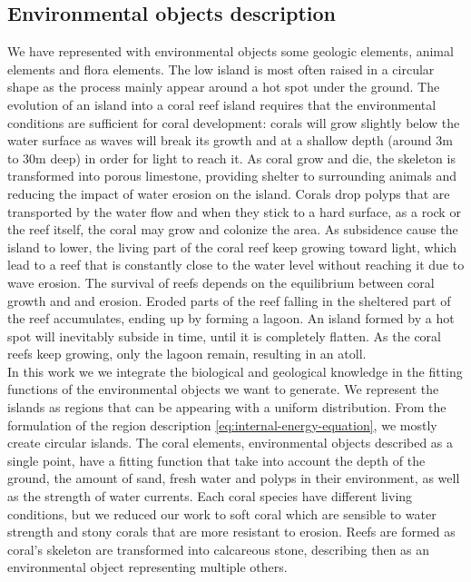 \subsection{Environmental objects description}
\label{sec:env-obj-represented-objects}
We have represented with environmental objects some geologic elements, animal elements and flora elements. The low island is most often raised in a circular shape as the process mainly appear around a hot spot under the ground. The evolution of an island into a coral reef island requires that the environmental conditions are sufficient for coral development: corals will grow slightly below the water surface as waves will break its growth and at a shallow depth (around 3m to 30m deep) in order for light to reach it. As coral grow and die, the skeleton is transformed into porous limestone, providing shelter to surrounding animals and reducing the impact of water erosion on the island. Corals drop polyps that are transported by the water flow and when they stick to a hard surface, as a rock or the reef itself, the coral may grow and colonize the area. As subsidence cause the island to lower, the living part of the coral reef keep growing toward light, which lead to a reef that is constantly close to the water level without reaching it due to wave erosion. The survival of reefs depends on the equilibrium between coral growth and and erosion. Eroded parts of the reef falling in the sheltered part of the reef accumulates, ending up by forming a lagoon. An island formed by a hot spot will inevitably subside in time, until it is completely flatten. As the coral reefs keep growing, only the lagoon remain, resulting in an atoll. \\
In this work we we integrate the biological and geological knowledge in the fitting functions of the environmental objects we want to generate. We represent the islands as regions that can be appearing with a uniform distribution. From the formulation of the region description \eqref{eq:internal-energy-equation}, we mostly create circular islands. The coral elements, environmental objects described as a single point, have a fitting function that take into account the depth of the ground, the amount of sand, fresh water and polyps in their environment, as well as the strength of water currents. Each coral species have different living conditions, but we reduced our work to soft coral which are sensible to water strength and stony corals that are more resistant to erosion. Reefs are formed as coral's skeleton are transformed into calcareous stone, describing then as an environmental object representing multiple others. 

